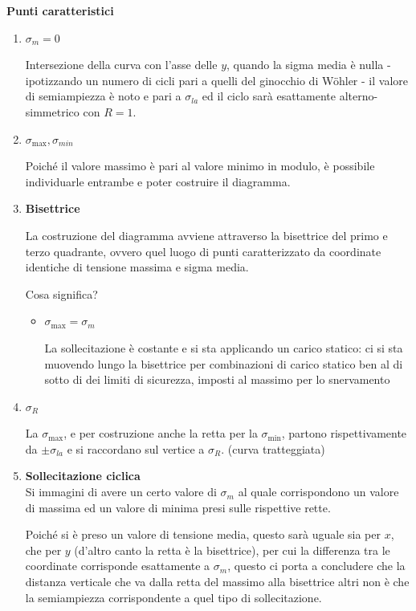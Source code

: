 			\textbf{Punti caratteristici}
			\begin{enumerate}
				\item \(\sigma_m = 0\) 
				
				Intersezione della curva con l'asse delle $y$, quando la sigma media è nulla  - ipotizzando un numero di cicli pari a quelli del ginocchio di Wöhler - il valore di semiampiezza è noto e pari a $\sigma_{la}$ ed il ciclo sarà esattamente alterno-simmetrico con $R=1$. 
				
				\item \(\sigma_{\max}, \sigma_{min}\)
				
				Poiché il valore massimo è pari al valore minimo in modulo, è possibile individuarle entrambe e poter costruire il diagramma. 
				
				
				\item \textbf{Bisettrice}
				
				La costruzione del diagramma avviene attraverso la bisettrice del primo e terzo quadrante, ovvero quel luogo di punti caratterizzato da coordinate identiche di tensione massima e sigma media.
				
				Cosa significa? 
				
				\begin{itemize}
					\item \(\sigma_{\max} = \sigma_m\)
					
					La sollecitazione è costante e si sta applicando un carico statico: ci si sta muovendo lungo la bisettrice per combinazioni di carico statico ben al di sotto di dei limiti di sicurezza, imposti al massimo per lo snervamento
				\end{itemize}
				
				\item \(\sigma_R\)
				
				La $\sigma_{\max}$, e per costruzione anche la retta per la $\sigma_{\min}$, partono rispettivamente da $\pm\sigma_{la}$ e si raccordano sul vertice a $\sigma_R$. (curva tratteggiata)
				
				\item \textbf{Sollecitazione ciclica}\\
				Si immagini di avere un certo valore di $\sigma_m$ al quale corrispondono un valore di massima ed un valore di minima presi sulle rispettive rette. 
				
				Poiché si è preso un valore di tensione media, questo sarà uguale sia per $x$, che per $y$ (d'altro canto la retta è la bisettrice), per cui la differenza tra le coordinate corrisponde esattamente a $\sigma_m$, questo ci porta a concludere che  la distanza verticale che va dalla retta del massimo alla bisettrice altri non è che la semiampiezza corrispondente a quel tipo di sollecitazione. 
				

\end{enumerate}
